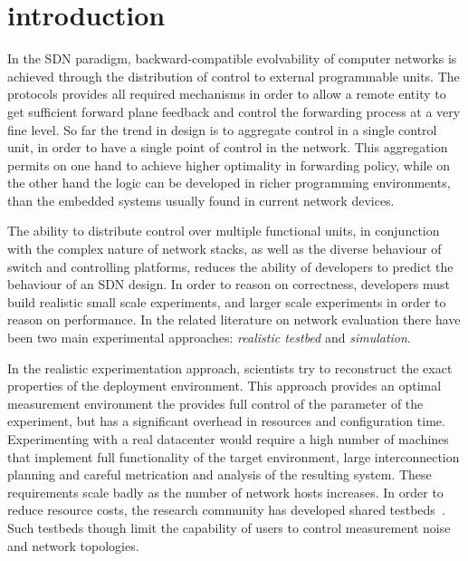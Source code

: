 

\section{\sdnsim introduction} \label{sec:sdnsim-intro}

In the SDN paradigm, backward-compatible evolvability of computer networks is
achieved through the distribution of control to external programmable units. The
protocols provides all required mechanisms in order to allow a remote entity to
get sufficient forward plane feedback and control the forwarding process at a very fine
level. So far the trend in \of design is to aggregate control in a single
control unit, in order to have a single point of control in the network. This
aggregation permits on one hand to achieve higher optimality in forwarding
policy, while on the other hand the logic can be developed in richer
programming environments, than the embedded systems usually found in current
network devices.

The ability to distribute control over multiple functional units, in conjunction
with the complex nature of network stacks, as well as the diverse behaviour of
\of switch and controlling platforms, reduces the ability of developers to
predict the behaviour of an SDN design. In order to reason on correctness,
developers must build realistic small scale experiments, and larger scale 
experiments in order to reason on performance. In the related literature on network
evaluation there have been two main experimental approaches:
\emph{realistic testbed} and \emph{simulation}.

In the realistic experimentation approach, scientists try to reconstruct the
exact properties of the deployment environment. This approach provides an
optimal measurement environment the provides full control of the parameter of
the experiment, but has a significant overhead in resources and configuration
time. Experimenting with a real datacenter would require a high number of
machines that implement full functionality of the target environment, large
interconnection planning and careful metrication and analysis of the resulting
system. These requirements scale badly as the number of network hosts increases.
In order to reduce resource costs, the research community has developed shared
testbeds~.  Such testbeds though limit the capability
of users to control measurement noise and network topologies. 

